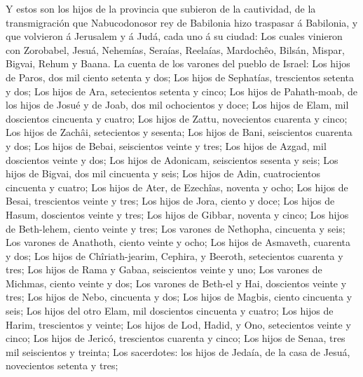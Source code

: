 Y estos son los hijos de la provincia que subieron de la
cautividad, de la transmigración que Nabucodonosor rey de Babilonia hizo
traspasar á Babilonia, y que volvieron á Jerusalem y á Judá, cada uno á
su ciudad:  Los cuales vinieron con Zorobabel, Jesuá,
Nehemías, Seraías, Reelaías, Mardochêo, Bilsán, Mispar, Bigvai, Rehum y
Baana. La cuenta de los varones del pueblo de Israel:  Los
hijos de Paros, dos mil ciento setenta y dos;  Los hijos de
Sephatías, trescientos setenta y dos;  Los hijos de Ara,
setecientos setenta y cinco;  Los hijos de Pahath-moab, de
los hijos de Josué y de Joab, dos mil ochocientos y doce; 
Los hijos de Elam, mil doscientos cincuenta y cuatro;  Los
hijos de Zattu, novecientos cuarenta y cinco;  Los hijos de
Zachâi, setecientos y sesenta;  Los hijos de Bani,
seiscientos cuarenta y dos;  Los hijos de Bebai,
seiscientos veinte y tres;  Los hijos de Azgad, mil
doscientos veinte y dos;  Los hijos de Adonicam,
seiscientos sesenta y seis;  Los hijos de Bigvai, dos mil
cincuenta y seis;  Los hijos de Adin, cuatrocientos
cincuenta y cuatro;  Los hijos de Ater, de Ezechîas,
noventa y ocho;  Los hijos de Besai, trescientos veinte y
tres;  Los hijos de Jora, ciento y doce;  Los
hijos de Hasum, doscientos veinte y tres;  Los hijos de
Gibbar, noventa y cinco;  Los hijos de Beth-lehem, ciento
veinte y tres;  Los varones de Nethopha, cincuenta y seis;
 Los varones de Anathoth, ciento veinte y ocho;
 Los hijos de Asmaveth, cuarenta y dos;  Los
hijos de Chîriath-jearim, Cephira, y Beeroth, setecientos cuarenta y
tres;  Los hijos de Rama y Gabaa, seiscientos veinte y uno;
 Los varones de Michmas, ciento veinte y dos; 
Los varones de Beth-el y Hai, doscientos veinte y tres; 
Los hijos de Nebo, cincuenta y dos;  Los hijos de Magbis,
ciento cincuenta y seis;  Los hijos del otro Elam, mil
doscientos cincuenta y cuatro;  Los hijos de Harim,
trescientos y veinte;  Los hijos de Lod, Hadid, y Ono,
setecientos veinte y cinco;  Los hijos de Jericó,
trescientos cuarenta y cinco;  Los hijos de Senaa, tres mil
seiscientos y treinta;  Los sacerdotes: los hijos de
Jedaía, de la casa de Jesuá, novecientos setenta y tres; 
